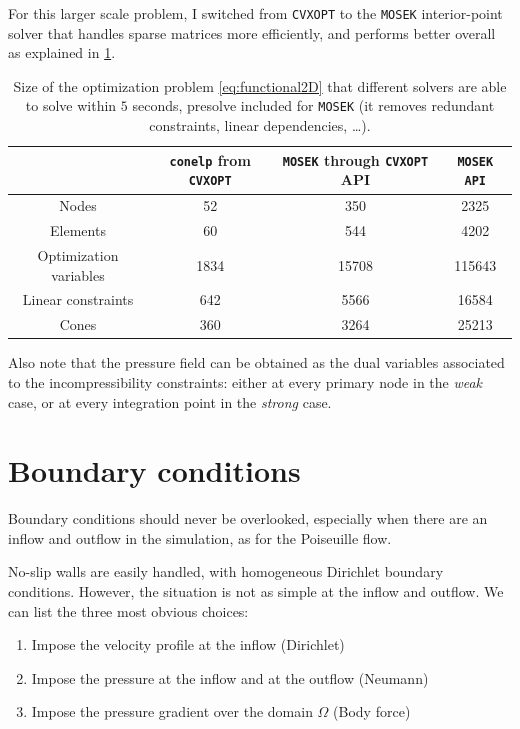 \documentclass[11 pt]{report}
\begin{document}
For this larger scale problem, I switched from \texttt{CVXOPT} \cite{cvxopt} to the \texttt{MOSEK} interior-point solver \cite{mosek} that handles sparse matrices more efficiently, and performs better overall as explained in \cref{tab:solvers}.
\begin{table}[h]
    \centering
    \begin{tabular}[t]{cccc}
        \toprule
         & \texttt{conelp} from \texttt{CVXOPT} \quad & \quad  \texttt{MOSEK} through \texttt{CVXOPT} API \quad & \quad \texttt{MOSEK API}\\
        \midrule
        Nodes & 52 & 350 & 2325\\
        Elements & 60 & 544 & 4202\\
        \midrule
        Optimization variables & 1834 & 15708 & 115643\\
        Linear constraints & 642 & 5566 & 16584\\
        Cones & 360 & 3264 & 25213\\
        \bottomrule
    \end{tabular}
    \caption{Size of the optimization problem \eqref{eq:functional2D} that different solvers are able to solve within $5$ seconds, presolve included for \texttt{MOSEK} (it removes redundant constraints, linear dependencies, \dots).}
    \label{tab:solvers}
\end{table}%


Also note that the pressure field can be obtained as the dual variables associated to the incompressibility constraints: either at every primary node in the \textit{weak} case, or at every integration point in the \textit{strong} case.

\section{Boundary conditions}
\label{sec:boundary_conditions}
Boundary conditions should never be overlooked, especially when there are an inflow and outflow in the simulation, as for the Poiseuille flow.

No-slip walls are easily handled, with homogeneous Dirichlet boundary conditions. However, the situation is not as simple at the inflow and outflow. We can list the three most obvious choices:
\begin{enumerate}
    \item Impose the velocity profile at the inflow (Dirichlet)
    \item Impose the pressure at the inflow and at the outflow (Neumann)
    \item Impose the pressure gradient over the domain $\Omega$ (Body force)
\end{enumerate}
\end{document}
